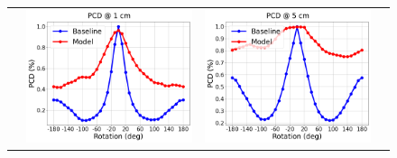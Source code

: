 \def\rot#1{\rotatebox{90}{#1}}
\begin{figure}
    \centering
    \begin{tabular}{cccc}
    \rot{~~~~~~~~\textbf{Synthetic}} &
    \includegraphics[scale=0.13]{main/chapter04/data/plot_pcd_1_synth.png} &
    \includegraphics[scale=0.13]{main/chapter04/data/plot_pcd_5_synth.png} &

\end{tabular}
\end{figure}
